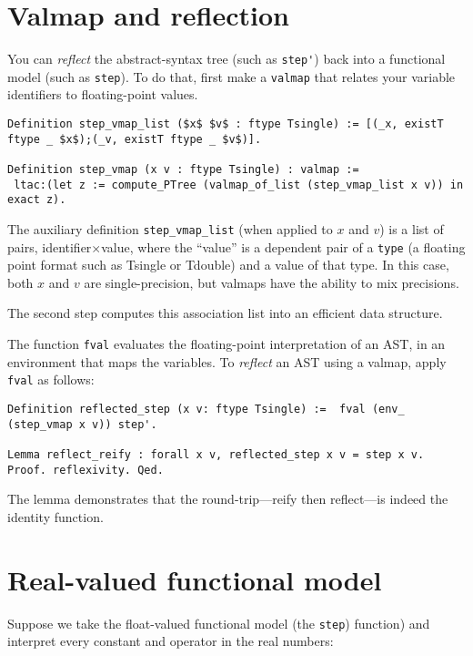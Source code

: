 \documentclass[article]{memoir}
\begin{document}
\chapter{Valmap and reflection}
\label{valmap}

You can \emph{reflect} the abstract-syntax tree (such as \lstinline{step'})
back into a functional model (such as \lstinline{step}).
To do that, first make a \lstinline{valmap} that relates your
variable identifiers to floating-point values.

\begin{lstlisting}
Definition step_vmap_list ($x$ $v$ : ftype Tsingle) := [(_x, existT ftype _ $x$);(_v, existT ftype _ $v$)].

Definition step_vmap (x v : ftype Tsingle) : valmap :=
 ltac:(let z := compute_PTree (valmap_of_list (step_vmap_list x v)) in exact z).
\end{lstlisting}
The auxiliary definition \lstinline{step_vmap_list}
(when applied to $x$ and $v$)
is a list of pairs, identifier$\times$value,
where the ``value'' is a dependent pair of a \lstinline{type} (a floating
point format such as Tsingle or Tdouble) and a value of that type.
In this case, both $x$ and $v$ are single-precision,
but valmaps have the ability to mix precisions.

The second step computes this association list into
an efficient data structure.

The function \lstinline{fval} evaluates the floating-point interpretation
of an AST, in an environment that maps the variables.
To \emph{reflect} an AST using a valmap, apply \lstinline{fval} as follows:

\begin{lstlisting}
Definition reflected_step (x v: ftype Tsingle) :=  fval (env_ (step_vmap x v)) step'.

Lemma reflect_reify : forall x v, reflected_step x v = step x v.
Proof. reflexivity. Qed.
\end{lstlisting}
The lemma demonstrates that the round-trip---reify then reflect---is indeed
the identity function.

\chapter{Real-valued functional model}

Suppose we take the float-valued functional model (the \lstinline{step}) 
function) and interpret every constant and operator in the real numbers:
\end{document}
